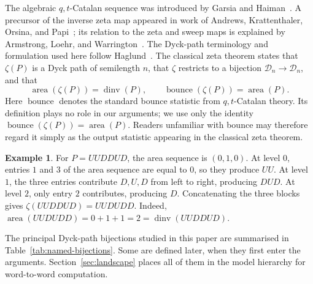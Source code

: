 \documentclass[11pt]{article}
\theoremstyle{definition}
\newtheorem{example}[theorem]{Example}
\newcommand{\D}{\mathcal D}
\newcommand{\area}{\operatorname{area}}
\newcommand{\dinv}{\operatorname{dinv}}
\newcommand{\bounce}{\operatorname{bounce}}
\begin{document}
The algebraic $q,t$-Catalan sequence was introduced by Garsia and
Haiman~\cite{GarsiaHaiman1996}.  A precursor of the inverse zeta map appeared
in work of Andrews, Krattenthaler, Orsina, and Papi~\cite{AndrewsEtAl2002};
its relation to the zeta and sweep maps is explained by Armstrong, Loehr, and
Warrington~\cite{ArmstrongLoehrWarrington2015}.  The Dyck-path terminology and
formulation used here follow Haglund~\cite{Haglund2008}.  The classical zeta
theorem states that
$\zeta(P)$ is a Dyck path of semilength $n$, that
$\zeta$ restricts to a bijection $\D_n\to\D_n$, and that
\[
   \area(\zeta(P))=\dinv(P),
   \qquad
   \bounce(\zeta(P))=\area(P).
\]
Here $\bounce$ denotes the standard bounce statistic from $q,t$-Catalan
theory.  Its definition plays no role in our arguments; we use only the
identity $\bounce(\zeta(P))=\area(P)$.  Readers unfamiliar with bounce may
therefore regard it simply as the output statistic appearing in the classical
zeta theorem.

\begin{example}
For $P=UUDDUD$, the area sequence is $(0,1,0)$.  At level $0$, entries $1$
and $3$ of the area sequence are equal to $0$, so they produce $UU$.  At
level $1$, the three entries contribute $D,U,D$ from left to right, producing
$DUD$.  At level $2$, only entry $2$ contributes, producing $D$.  Concatenating
the three blocks gives
$\zeta(UUDDUD)=UUDUDD$.  Indeed,
$\area(UUDUDD)=0+1+1=2=\dinv(UUDDUD)$.
\end{example}

The principal Dyck-path bijections studied in this paper are summarised in
Table~\ref{tab:named-bijections}.  Some are defined later, when they first
enter the arguments.  Section~\ref{sec:landscape} places all of them in the
model hierarchy for word-to-word computation.
\end{document}
